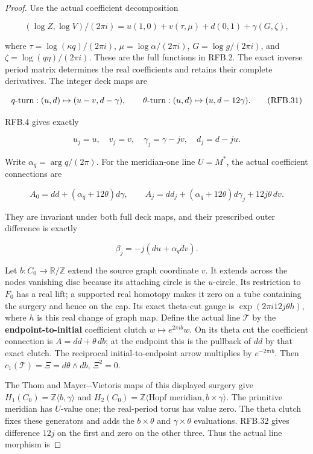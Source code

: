\begin{proof}
Use the actual coefficient decomposition

\[
 (\log Z,\log V)/(2\pi i)=
 u(1,0)+v(\tau,\mu)+d(0,1)+\gamma(G,\zeta),
 \tag{RFB.30}
\]

where \(\tau=\log(\kappa q)/(2\pi i)\),
\(\mu=\log\alpha/(2\pi i)\), \(G=\log g/(2\pi i)\),
and \(\zeta=\log(q\eta)/(2\pi i)\). These are the full
functions in RFB.2. The exact inverse period matrix determines the
real coefficients and retains their complete derivatives. The
integer deck maps are

\[
 q\hbox{-turn}:(u,d)\mapsto(u-v,d-\gamma),\qquad
 \theta\hbox{-turn}:(u,d)\mapsto(u,d-12\gamma).
 \tag{RFB.31}
\]

RFB.4 gives exactly

\[
 u_j=u,\quad v_j=v,\quad\gamma_j=\gamma-jv,\quad d_j=d-ju.
 \tag{RFB.32}
\]

Write \(\alpha_q=\arg q/(2\pi)\). For the meridian-one line
\(U=M^*\), the actual coefficient connections are

\[
 A_0=dd+(\alpha_q+12\theta)d\gamma,\qquad
 A_j=dd_j+(\alpha_q+12\theta)d\gamma_j+12j\theta\,dv.
 \tag{RFB.33}
\]

They are invariant under both full deck maps, and their prescribed
outer difference is exactly

\[
                  \beta_j=-j(du+\alpha_qdv).
 \tag{RFB.34}
\]

Let \(b:C_0\to\mathbb R/\mathbb Z\) extend the source graph
coordinate \(v\). It extends across the node\textquotesingle s vanishing disc
because its attaching circle is the \(u\)-circle. Its restriction
to \(F_0\) has a real lift; a supported real homotopy makes it zero
on a tube containing the surgery and hence on the cap. Its exact
theta-cut gauge is \(\exp(2\pi i12j\theta h)\), where \(h\)
is this real change of graph map. Define the actual line
\(\mathcal T\) by the \textbf{endpoint-to-initial} coefficient clutch
\(w\mapsto e^{2\pi ib}w\). On its theta cut the coefficient
connection is \(A=dd+\theta\,db\); at the endpoint this is the
pullback of \(dd\) by that exact clutch. The reciprocal
initial-to-endpoint arrow multiplies by \(e^{-2\pi ib}\).
Then \(c_1(\mathcal T)=\Xi=d\theta\wedge db\), \(\Xi^2=0\).

The Thom and Mayer-\/-Vietoris maps of this displayed surgery give
\(H_1(C_0)=\mathbb Z\langle b,\gamma\rangle\) and
\(H_2(C_0)=\mathbb Z\langle\text{Hopf meridian},b\times\gamma\rangle\).
The primitive meridian has \(U\)-value one; the real-period torus
has value zero. The theta clutch fixes these generators and adds
the \(b\times\theta\) and \(\gamma\times\theta\) evaluations.
RFB.32 gives difference \(12j\) on the first and zero on the other
three. Thus the actual line morphism is


\end{proof}
